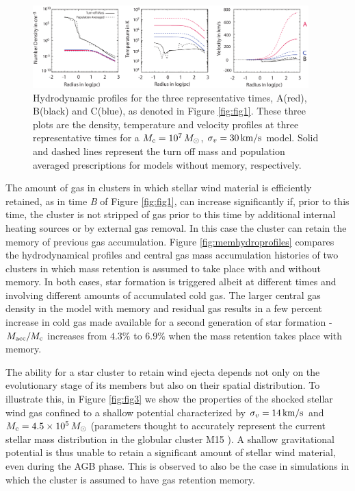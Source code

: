 \documentclass[fleqn,usenatbib]{mnras}
\begin{document}
\begin{figure}
\centering\includegraphics[width=0.95\textwidth]{fig2_updated.pdf}
\caption{Hydrodynamic profiles for the three representative times, A(red), B(black) and C(blue), as denoted in Figure \ref{fig:fig1}.  
These three plots are the density, temperature and velocity profiles at three 
representative times for a $M_{\rm c} = 10^7 \, M_\odot$, $\sigma_v = 30 \, {\rm km/s}$ model.   
Solid and dashed lines represent the turn off mass and population averaged prescriptions for models without memory, respectively.  }
\label{fig:fig2}
\end{figure} 



The amount of gas in clusters in which stellar wind material is efficiently retained, as in time {\it B} of Figure \ref{fig:fig1}, can increase significantly if, prior to this time, the cluster is not stripped of gas prior to this time by  additional internal  heating sources or by external gas removal. In this case the cluster can retain the memory of previous gas accumulation.
Figure \ref{fig:memhydroprofiles} compares the hydrodynamical profiles and central gas mass accumulation histories of two clusters in which mass retention is assumed to take place with and without memory.  In both cases, star formation is triggered albeit at different times and involving different amounts of accumulated cold gas. The larger central gas density in the model with memory and residual gas results in a few percent increase in cold gas made available for a second generation of star formation - $M_{\rm acc}/M_{\rm c}$ increases from $4.3\%$ to $6.9\%$ when the mass retention takes place with memory.

The ability for a star cluster to retain wind ejecta depends not only on the evolutionary stage of its members but also on their spatial distribution. To illustrate this, in Figure \ref{fig:fig3} we show the  properties of the shocked stellar wind gas confined to a shallow potential characterized  by 
$\sigma_v = 14 \, {\rm km/s}$ and $M_{\rm c} = 4.5 \times 10^5 \, M_\odot$ (parameters  thought to accurately represent the current  stellar mass distribution in the globular cluster M15 \citep{mcnamara,gerssen}).  A shallow gravitational potential is thus unable to retain a significant amount of stellar wind material, even during the AGB phase.   This is observed to also be the case in simulations  in which the cluster is assumed to have gas retention memory. 
\end{document}
